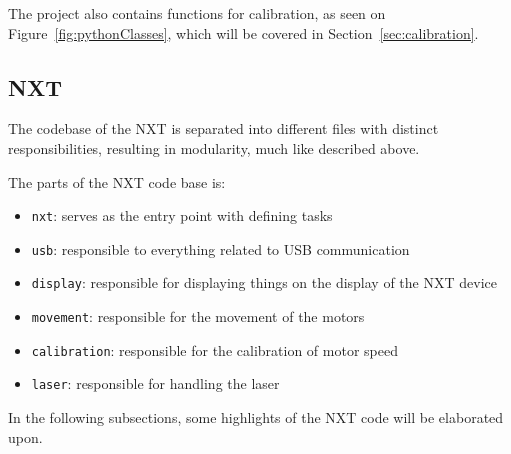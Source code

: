 The project also contains functions for calibration, as seen on Figure~\ref{fig:pythonClasses}, which will be covered in Section~\ref{sec:calibration}.


\subsection{NXT}
The codebase of the NXT is separated into different files with distinct responsibilities, resulting in modularity, much like described above.

The parts of the NXT code base is:
\begin{itemize}
	\item \texttt{nxt}: serves as the entry point with defining tasks
	\item \texttt{usb}: responsible to everything related to USB communication
	\item \texttt{display}: responsible for displaying things on the display of the NXT device
	\item \texttt{movement}: responsible for the movement of the motors
	\item \texttt{calibration}: responsible for the calibration of motor speed
	\item \texttt{laser}: responsible for handling the laser
\end{itemize}

In the following subsections, some highlights of the NXT code will be elaborated upon.